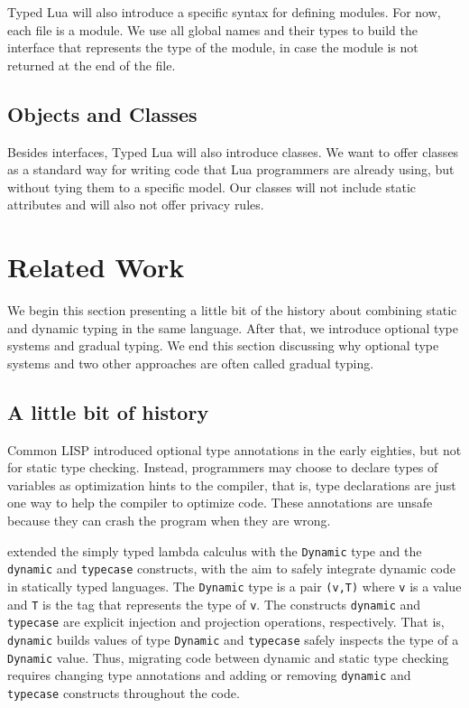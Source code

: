 \documentclass[preprint]{sig-alternate}
\begin{document}
Typed Lua will also introduce a specific syntax for defining modules.
For now, each file is a module.
We use all global names and their types to build the interface that
represents the type of the module, in case the module is not returned
at the end of the file.

\subsection{Objects and Classes}

Besides interfaces, Typed Lua will also introduce classes.
We want to offer classes as a standard way for writing code that
Lua programmers are already using, but without tying them to a
specific model.
Our classes will not include static attributes and will also not offer
privacy rules.


\section{Related Work}
 \label{sec:review}

We begin this section presenting a little bit of the history about
combining static and dynamic typing in the same language.
After that, we introduce optional type systems and gradual typing.
We end this section discussing why optional type systems and two
other approaches are often called gradual typing.

\subsection{A little bit of history}

Common LISP \citep{steele1982ocl} introduced optional type annotations
in the early eighties, but not for static type checking.
Instead, programmers may choose to declare types of variables as
optimization hints to the compiler, that is, type declarations are
just one way to help the compiler to optimize code.
These annotations are unsafe because they can crash the program
when they are wrong.

\citet{abadi1989dts} extended the simply typed lambda calculus with the
\texttt{Dynamic} type and the \texttt{dynamic} and \texttt{typecase}
constructs, with the aim to safely integrate dynamic code in
statically typed languages.
The \texttt{Dynamic} type is a pair \texttt{(v,T)} where \texttt{v} is a
value and \texttt{T} is the tag that represents the type of \texttt{v}.
The constructs \texttt{dynamic} and \texttt{typecase} are explicit
injection and projection operations, respectively.
That is, \texttt{dynamic} builds values of type \texttt{Dynamic} and
\texttt{typecase} safely inspects the type of a \texttt{Dynamic} value.
Thus, migrating code between dynamic and static type checking requires
changing type annotations and adding or removing \texttt{dynamic} and
\texttt{typecase} constructs throughout the code.
\end{document}
